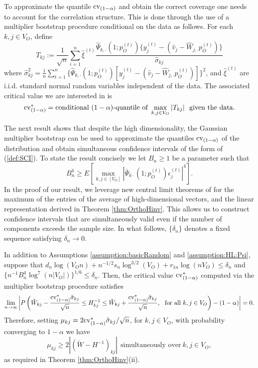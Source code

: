 \documentclass[opre,nonblindrev]{informs3} %
\begin{document}
\begin{APPENDIX}{}
	To approximate the quantile ${\rm cv}_{(1-\alpha)}$ and obtain the correct coverage one needs to account for the correlation structure. This is done through the use of a multiplier bootstrap procedure conditional on the data as follows. 
For each $k,j\in V_O$, define
	$$ T_{kj} := \frac{1}{\sqrt{n}}\sum_{i=1}^n \hat\xi^{(t)} \frac{\hat \Psi_{k,\cdot}(1;p_O^{(t)})\{ y_j^{(t)} - (\hat v_j - \hat W_{j,\cdot} p_O^{(t)})\}}{\hat\sigma_{kj}} $$
	where $\hat\sigma_{kj}^2 = \frac{1}{n}\sum_{t=1}^n \{\hat \Psi_{k,\cdot}(1;{p}_O^{(t)})[ y_j^{(t)} - (\hat v_j - \hat W_{j,\cdot} p_O^{(t)})]\}^2$, and $\hat\xi^{(t)}$ are i.i.d. standard normal random variables independent of the data.  The associated critical value we are interested in is
	$$ {\rm cv}^*_{(1-\alpha)} = \mbox{conditional} \  (1-\alpha)\mbox{-quantile of} \ \max_{k,j\in V_O} |T_{kj} | \ \ \mbox{given the data}.$$
	
	
	The next result shows that despite the high dimensionality, the Gaussian multiplier bootstrap can be used to approximate the quantiles ${\rm cv}_{(1-\alpha)}$ of the distribution and obtain simultaneous confidence intervals of the form of (\ref{def:SCI}). To state the result concisely we let $B_n \geq 1$ be a parameter such that
	\begin{equation}
	B_n^4 \geq E[\max_{k,j\in [V_O]} |\bar \Psi_{k\cdot}(1;p_O^{(t)})\epsilon_j^{(t)}|^4 ].
	\end{equation}
In the proof of our result, we
 	leverage new central limit theorems
 	of \cite{belloni2018high}
 	 for the maximum of the entries of the average of high-dimensional vectors, and the linear
 	  representation derived in Theorem \ref{thm:OrthoHinv}.
This allows us to construct  confidence intervals that are simultaneously valid even if the number of components exceeds the sample size.
 	  In what follows, 
 $\{\delta_n \}$ denotes a fixed sequence satisfying
 $\delta_n\to 0$.
	
	
	
	\begin{theorem}\label{thm:inferenceAlg1}
		In addition to Assumptions \ref{assumption:basicRandom} and \ref{assumption:HL:Psi}, suppose that $d_n\log(V_On) + n^{-1/2}s_n\log^{3/2}(V_O)+r_{1n}\log(nV_O)\leq \delta_n$ and  $\{n^{-1}B_n^4\log^7(n|V_O|)\}^{1/6}\leq \delta_n$.
		Then, the critical value ${\rm cv}^*_{(1-\alpha)}$ computed via the multiplier bootstrap procedure satisfies
		$$ \lim_{n\to \infty} \left|P \left( \check W_{kj} - \frac{{\rm cv}^*_{(1-\alpha)} \hat\sigma_{kj}}{\sqrt{n}}\leq H^{-1}_{kj} \leq \check W_{kj} + \frac{{\rm cv}^*_{(1-\alpha)} \hat \sigma_{kj}}{\sqrt{n}}, \ \ \mbox{for all} \  k,j\in V_O\right) - (1-\alpha)\right| = 0.$$
		Therefore, setting $\mu_{kj} = 2{\rm cv}^*_{(1-\alpha)}\hat\sigma_{kj}/\sqrt{n}$, for $k,j\in V_O$, with probability converging to $1-\alpha$ we have
		$$ \mu_{kj} \geq 2|(\check W - H^{-1})_{kj}| \ \  \mbox{simultaneously over} \ k,j\in V_O,$$
		as required in Theorem \ref{thm:OrthoHinv}(ii).
	\end{theorem}
	

\end{APPENDIX}
\end{document}
